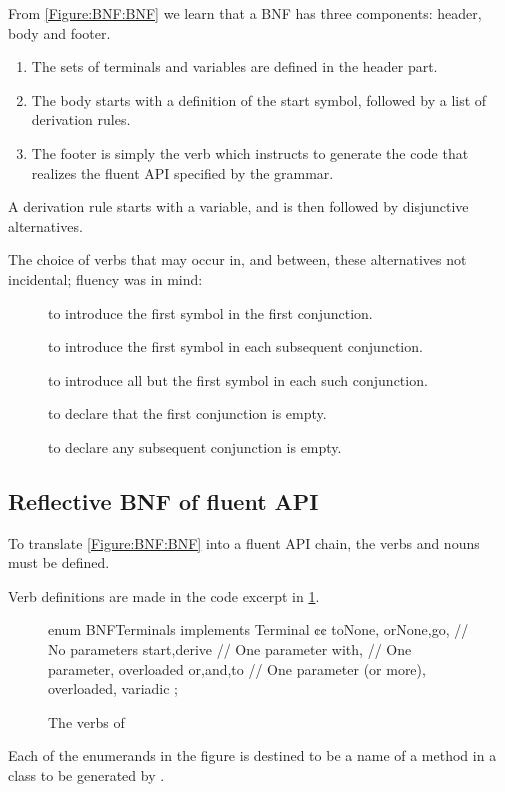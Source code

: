 From \cref{Figure:BNF:BNF} we learn 
  that a BNF has three components: header, body and footer.
  \begin{enumerate}
    \item The sets of terminals and variables are defined in the header part.
    \item The body starts with a definition of the start symbol, followed by a list of derivation
  rules. 
\item The footer is simply the verb  which instructs \Self
  to generate the code that realizes the fluent API specified by the grammar.
  \end{enumerate}

A derivation rule starts with a variable, and is then followed by disjunctive alternatives.

The choice of verbs that may occur in, and between, these alternatives not incidental; 
  fluency was in mind:
\begin{description}
  \item[] to introduce the first symbol in the first conjunction.
  \item[] to introduce the first symbol in each subsequent conjunction.
  \item[] to introduce all but the first symbol in each such conjunction.
  \item[] to declare that the first conjunction is empty.
  \item[] to declare any subsequent conjunction is empty.
\end{description}

\subsection{Reflective BNF of fluent API}

To translate \cref{Figure:BNF:BNF} into a fluent
API chain, the verbs and nouns must be defined.

Verb definitions are made in the code excerpt in
\cref{Figure:Verbs}.

\begin{figure}[H]
  \begin{JAVA}[style=code]
enum BNFTerminals implements Terminal {¢¢
  toNone, orNone,go, // No parameters
  start,derive            // One parameter 
  with,             // One parameter, overloaded 
  or,and,to        // One parameter (or more), overloaded, variadic 
  ;
} 
  \end{JAVA}
  \caption{The verbs of \Self}
  \label{Figure:Verbs}
\end{figure}
Each of the enumerands in the figure is destined to be a 
  name of a method in a class to be generated by \Self.

